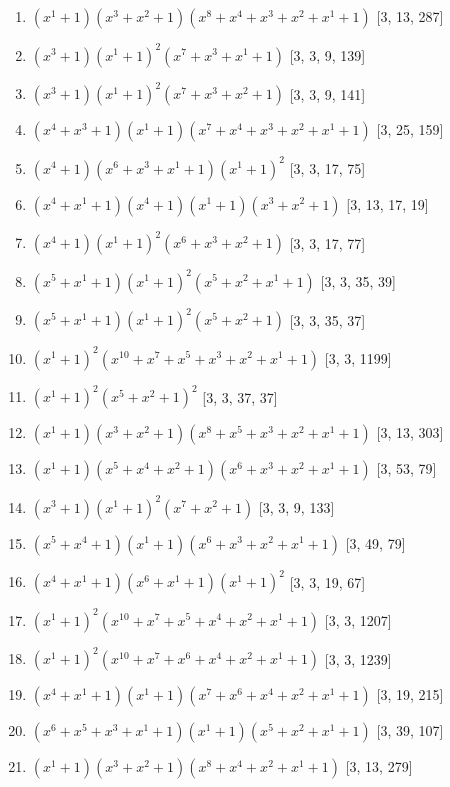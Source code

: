 \documentclass[10pt,twocolumn]{article}
\begin{document}
\begin{enumerate}
\item $(x^{1} + 1)(x^{3} + x^{2} + 1)(x^{8} + x^{4} + x^{3} + x^{2} + x^{1} + 1)$  [3, 13, 287]
\item $(x^{3} + 1)(x^{1} + 1)^{2}(x^{7} + x^{3} + x^{1} + 1)$  [3, 3, 9, 139]
\item $(x^{3} + 1)(x^{1} + 1)^{2}(x^{7} + x^{3} + x^{2} + 1)$  [3, 3, 9, 141]
\item $(x^{4} + x^{3} + 1)(x^{1} + 1)(x^{7} + x^{4} + x^{3} + x^{2} + x^{1} + 1)$  [3, 25, 159]
\item $(x^{4} + 1)(x^{6} + x^{3} + x^{1} + 1)(x^{1} + 1)^{2}$  [3, 3, 17, 75]
\item $(x^{4} + x^{1} + 1)(x^{4} + 1)(x^{1} + 1)(x^{3} + x^{2} + 1)$  [3, 13, 17, 19]
\item $(x^{4} + 1)(x^{1} + 1)^{2}(x^{6} + x^{3} + x^{2} + 1)$  [3, 3, 17, 77]
\item $(x^{5} + x^{1} + 1)(x^{1} + 1)^{2}(x^{5} + x^{2} + x^{1} + 1)$  [3, 3, 35, 39]
\item $(x^{5} + x^{1} + 1)(x^{1} + 1)^{2}(x^{5} + x^{2} + 1)$  [3, 3, 35, 37]
\item $(x^{1} + 1)^{2}(x^{10} + x^{7} + x^{5} + x^{3} + x^{2} + x^{1} + 1)$  [3, 3, 1199]
\item $(x^{1} + 1)^{2}(x^{5} + x^{2} + 1)^{2}$  [3, 3, 37, 37]
\item $(x^{1} + 1)(x^{3} + x^{2} + 1)(x^{8} + x^{5} + x^{3} + x^{2} + x^{1} + 1)$  [3, 13, 303]
\item $(x^{1} + 1)(x^{5} + x^{4} + x^{2} + 1)(x^{6} + x^{3} + x^{2} + x^{1} + 1)$  [3, 53, 79]
\item $(x^{3} + 1)(x^{1} + 1)^{2}(x^{7} + x^{2} + 1)$  [3, 3, 9, 133]
\item $(x^{5} + x^{4} + 1)(x^{1} + 1)(x^{6} + x^{3} + x^{2} + x^{1} + 1)$  [3, 49, 79]
\item $(x^{4} + x^{1} + 1)(x^{6} + x^{1} + 1)(x^{1} + 1)^{2}$  [3, 3, 19, 67]
\item $(x^{1} + 1)^{2}(x^{10} + x^{7} + x^{5} + x^{4} + x^{2} + x^{1} + 1)$  [3, 3, 1207]
\item $(x^{1} + 1)^{2}(x^{10} + x^{7} + x^{6} + x^{4} + x^{2} + x^{1} + 1)$  [3, 3, 1239]
\item $(x^{4} + x^{1} + 1)(x^{1} + 1)(x^{7} + x^{6} + x^{4} + x^{2} + x^{1} + 1)$  [3, 19, 215]
\item $(x^{6} + x^{5} + x^{3} + x^{1} + 1)(x^{1} + 1)(x^{5} + x^{2} + x^{1} + 1)$  [3, 39, 107]
\item $(x^{1} + 1)(x^{3} + x^{2} + 1)(x^{8} + x^{4} + x^{2} + x^{1} + 1)$  [3, 13, 279]

\end{enumerate}
\end{document}
